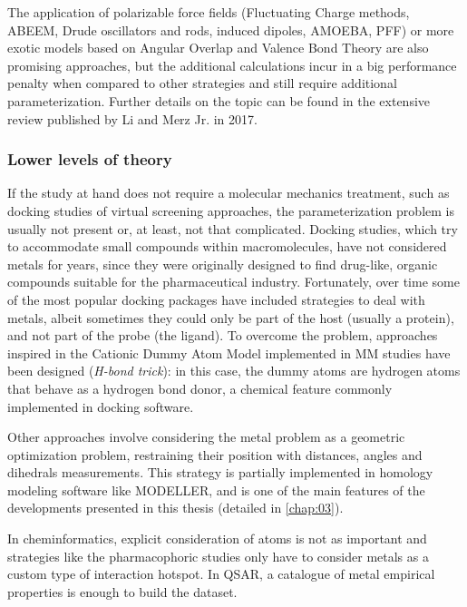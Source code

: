 The application of polarizable force fields (Fluctuating Charge methods, ABEEM, Drude oscillators and rods, induced dipoles, AMOEBA, PFF) or more exotic models based on Angular Overlap and Valence Bond Theory are also promising approaches, but the additional calculations incur in a big performance penalty when compared to other strategies and still require additional parameterization. Further details on the topic can be found in the extensive review published by Li and Merz Jr. in 2017.\cite{li2017}

\subsubsection{Lower levels of theory}
If the study at hand does not require a molecular mechanics treatment, such as docking studies of virtual screening approaches, the parameterization problem is usually not present or, at least, not that complicated. Docking studies, which try to accommodate small compounds within macromolecules, have not considered metals for years, since they were originally designed to find drug-like, organic compounds suitable for the pharmaceutical industry. Fortunately, over time some of the most popular docking packages have included strategies to deal with metals,\cite{flexx} albeit sometimes they could only be part of the host (usually a protein), and not part of the probe (the ligand).\cite{verdonk2003improved} To overcome the problem, approaches inspired in the Cationic Dummy Atom Model implemented in MM studies have been designed (\textit{H-bond trick}): in this case, the dummy atoms are hydrogen atoms that behave as a hydrogen bond donor, a chemical feature commonly implemented in docking software.

Other approaches involve considering the metal problem as a geometric optimization problem, restraining their position with distances, angles and dihedrals measurements. This strategy is partially implemented in homology modeling software like MODELLER, \cite{Sali1993} and is one of the main features of the developments presented in this thesis (detailed in \autoref{chap:03}).

In cheminformatics, explicit consideration of atoms is not as important and strategies like the pharmacophoric studies only have to consider metals as a custom type of interaction hotspot.\cite{johns2009,kawasuji2012,carcelli2014,yang2016} In QSAR, a catalogue of metal empirical properties is enough to build the dataset.\cite{walker2012fundamental}

